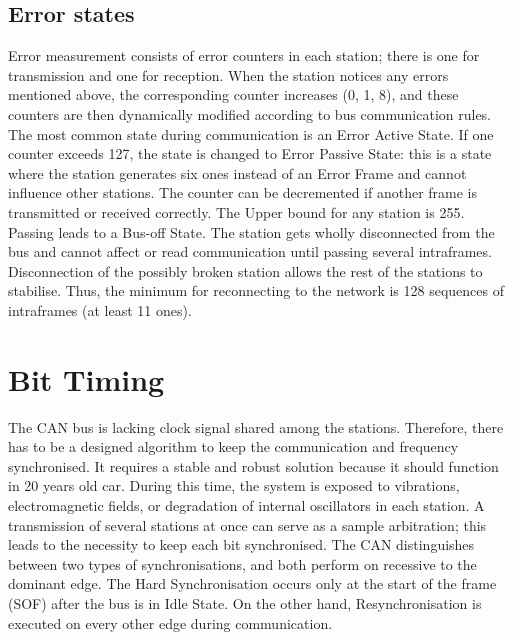 \documentclass{ctuthesis}
\begin{document}
 \subsection{Error states}
 Error measurement consists of error counters in each station; there is one for transmission and one for reception. When the station notices any errors mentioned above, the corresponding counter increases (0, 1, 8), and these counters are then dynamically modified according to bus communication rules. The most common state during communication is an Error Active State. If one counter exceeds 127, the state is changed to Error Passive State: this is a state where the station generates six ones instead of an Error Frame and cannot influence other stations. The counter can be decremented if another frame is transmitted or received correctly. The Upper bound for any station is 255. Passing leads to a Bus-off State. The station gets wholly disconnected from the bus and cannot affect or read communication until passing several intraframes. Disconnection of the possibly broken station allows the rest of the stations to stabilise. Thus, the minimum for reconnecting to the network is 128 sequences of intraframes (at least 11 ones).
 
 \section{Bit Timing}
 The CAN bus is lacking clock signal shared among the stations. Therefore, there has to be a designed algorithm to keep the communication and frequency synchronised. It requires a stable and robust solution because it should function in 20 years old car. During this time, the system is exposed to vibrations, electromagnetic fields, or degradation of internal oscillators in each station. A transmission of several stations at once can serve as a sample arbitration; this leads to the necessity to keep each bit synchronised. The CAN distinguishes between two types of synchronisations, and both perform on recessive to the dominant edge. The Hard Synchronisation occurs only at the start of the frame (SOF) after the bus is in Idle State. On the other hand, Resynchronisation is executed on every other edge during communication.
 
\end{document}
